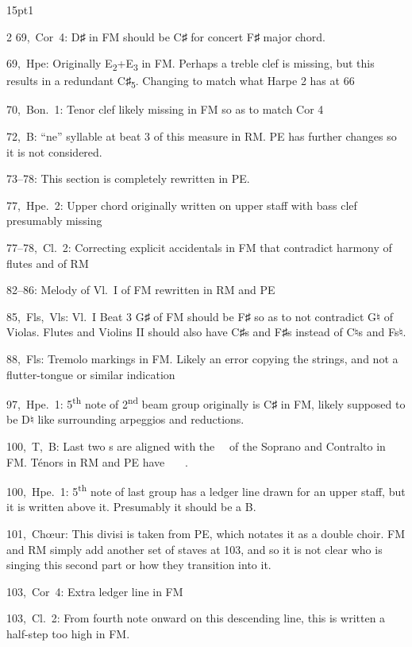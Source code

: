 \documentclass[twoside]{article}
\begin{document}
\begin{hangparas}{15pt}{1}
\begin{multicols}{2}
\mbox{69, Cor 4}: D♯ in FM should be C♯ for concert F♯ major chord.

\mbox{69, Hpe}: Originally E\textsubscript{2}+E\textsubscript{3} in FM. Perhaps a treble clef is missing, but this results in a redundant C♯\textsubscript{5}. Changing to match what Harpe 2 has at 66

\mbox{70, Bon.~1}: Tenor clef likely missing in FM so as to match Cor 4

\mbox{72, B}: ``ne'' syllable at beat 3 of this measure in RM. PE has further changes so it is not considered.

\mbox{73--78}: This section is completely rewritten in PE.

\mbox{77, Hpe.~2}: Upper chord originally written on upper staff with bass clef presumably missing

\mbox{77--78, Cl.~2}: Correcting explicit accidentals in FM that contradict harmony of flutes and of RM

\mbox{82--86}: Melody of \mbox{Vl.~I} of FM rewritten in RM and PE

\mbox{85, Fls, Vls}: \mbox{Vl.~I} Beat 3 G♯ of FM should be F♯ so as to not contradict G♮ of Violas. Flutes and Violins II should also have C♯s and F♯s instead of C♮s and Fs♮.

\mbox{88, Fls}: Tremolo markings in FM. Likely an error copying the strings, and not a flutter-tongue or similar indication

\mbox{97, Hpe.~1}: 5\textsuperscript{th} note of 2\textsuperscript{nd} beam group originally is C♯ in FM, likely supposed to be D♮ like surrounding arpeggios and reductions.

\mbox{100, T, B}: Last two \Vier s are aligned with the \Vier\Pu\ \Acht\ of the Soprano and Contralto in FM. Ténors in RM and PE have \Vier\Pu\ \Acht\ \ .

\mbox{100, Hpe.~1}: 5\textsuperscript{th} note of last group has a ledger line drawn for an upper staff, but it is written above it. Presumably it should be a B.

\mbox{101, Chœur}: This divisi is taken from PE, which notates it as a double choir. FM and RM simply add another set of staves at 103, and so it is not clear who is singing this second part or how they transition into it.

\mbox{103, Cor 4}: Extra ledger line in FM

\mbox{103, Cl.~2}: From fourth note onward on this descending line, this is written a half-step too high in FM.


\end{multicols}
\end{hangparas}
\end{document}
